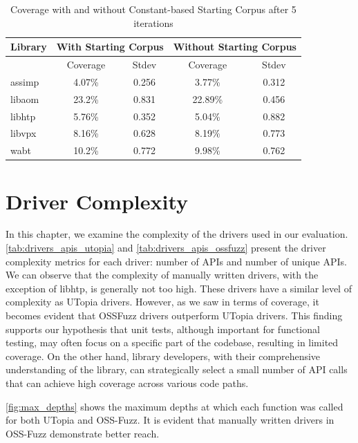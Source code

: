 \documentclass[a4paper,11pt,oneside]{report}
\begin{document}
\begin{table}[htbp]
  \centering
  \caption{Coverage with and without Constant-based Starting Corpus after 5 iterations}
  \label{tab:constant-corpus}
  \begin{tabular}{lcc|cc}
    \hline
    Library & \multicolumn{2}{c}{With Starting Corpus} & \multicolumn{2}{c}{Without Starting Corpus} \\
    \hline
    & Coverage & Stdev & Coverage & Stdev \\
    \hline
    assimp & 4.07\% & 0.256 & 3.77\% & 0.312 \\
    libaom & 23.2\% & 0.831 & 22.89\% & 0.456 \\
    libhtp & 5.76\% & 0.352 & 5.04\% & 0.882 \\
    libvpx & 8.16\% & 0.628 & 8.19\% & 0.773 \\
    wabt & 10.2\% & 0.772 & 9.98\% & 0.762 \\
    \hline
  \end{tabular}
\end{table}



\section{Driver Complexity}

In this chapter, we examine the complexity of the drivers used in our evaluation.
\autoref{tab:drivers_apis_utopia}  and \autoref{tab:drivers_apis_ossfuzz} present the driver 
complexity metrics for each driver: number of APIs and number of unique APIs. 
We can observe that the complexity of manually written drivers, 
with the exception of libhtp, is generally not too high. 
These drivers have a similar level of complexity as UTopia drivers. 
However, as we saw in terms of coverage, it becomes evident that OSSFuzz 
drivers outperform UTopia drivers. This finding supports our hypothesis 
that unit tests, although important for functional testing, may often 
focus on a specific part of the codebase, resulting in limited coverage. 
On the other hand, library developers, with their comprehensive understanding 
of the library, can strategically select a small number of API calls that 
can achieve high coverage across various code paths.

\autoref{fig:max_depths} shows the maximum depths at which each function
was called for both UTopia and OSS-Fuzz. It is evident that manually
written drivers in OSS-Fuzz demonstrate better reach. 
\end{document}
